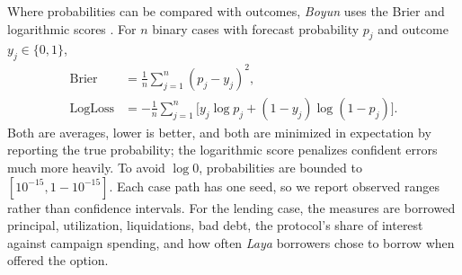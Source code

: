 Where probabilities can be compared with outcomes, \textit{Boyun} uses the
Brier and logarithmic scores \cite{brier1950,gneiting2007}. For $n$ binary
cases with forecast probability $p_j$ and outcome $y_j\in\{0,1\}$,
\begin{align}
\operatorname{Brier}&=\frac{1}{n}\sum_{j=1}^{n}(p_j-y_j)^2,\label{eq:brier}\\
\operatorname{LogLoss}&=-\frac{1}{n}\sum_{j=1}^{n}\big[y_j\log p_j+(1-y_j)\log(1-p_j)\big].\label{eq:logloss}
\end{align}
Both are averages, lower is better, and both are minimized in expectation by
reporting the true probability; the logarithmic score penalizes confident
errors much more heavily. To avoid $\log 0$, probabilities are bounded to
$[10^{-15},1-10^{-15}]$. Each case path has one seed, so we report observed
ranges rather than confidence intervals.
For the lending case, the measures are borrowed principal, utilization,
liquidations, bad debt, the protocol's share of interest against campaign
spending, and how often \textit{Laya} borrowers chose to borrow when offered the option.
